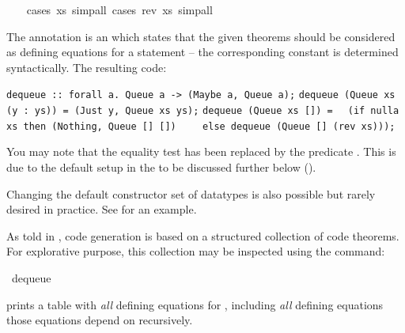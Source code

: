 \begin{isabellebody}
\ \ \isamarkupfalse%
\ {\isacharparenleft}cases\ xs{\isacharcomma}\ simp{\isacharunderscore}all{\isacharparenright}\ {\isacharparenleft}cases\ {\isachardoublequoteopen}rev\ xs{\isachardoublequoteclose}{\isacharcomma}\ simp{\isacharunderscore}all{\isacharparenright}%
\endisatagquote
{\isafoldquote}%
%
\isadelimquote
%
\endisadelimquote
%
\begin{isamarkuptext}%
\noindent The annotation  is an 
   which states that the given theorems should be
  considered as defining equations for a  statement --
  the corresponding constant is determined syntactically.  The resulting code:%
\end{isamarkuptext}%
\isamarkuptrue%
%
\isadelimquote
%
\endisadelimquote
%
\isatagquote
%
\begin{isamarkuptext}%
\isaverbatim%
\noindent%
\verb|dequeue :: forall a. Queue a -> (Maybe a, Queue a);|\newline%
\verb|dequeue (Queue xs (y : ys)) = (Just y, Queue xs ys);|\newline%
\verb|dequeue (Queue xs []) =|\newline%
\verb|  (if nulla xs then (Nothing, Queue [] [])|\newline%
\verb|    else dequeue (Queue [] (rev xs)));|%
\end{isamarkuptext}%
\isamarkuptrue%
%
\endisatagquote
{\isafoldquote}%
%
\isadelimquote
%
\endisadelimquote
%
\begin{isamarkuptext}%
\noindent You may note that the equality test  has been
  replaced by the predicate .  This is due to the default
  setup in the  to be discussed further below ().

  Changing the default constructor set of datatypes is also
  possible but rarely desired in practice.  See  for an example.

  As told in , code generation is based
  on a structured collection of code theorems.
  For explorative purpose, this collection
  may be inspected using the \hyperlink{command.code-thms}{\mbox{}} command:%
\end{isamarkuptext}%
\isamarkuptrue%
%
\isadelimquote
%
\endisadelimquote
%
\isatagquote
{}\isamarkupfalse%
\ dequeue%
\endisatagquote
{\isafoldquote}%
%
\isadelimquote
%
\endisadelimquote
%
\begin{isamarkuptext}%
\noindent prints a table with \emph{all} defining equations
  for , including
  \emph{all} defining equations those equations depend
  on recursively.
  

\end{isamarkuptext}
\end{isabellebody}
